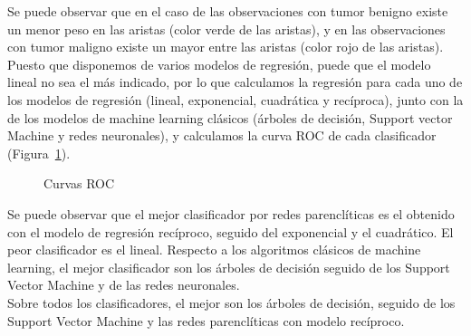 Se puede observar que en el caso de las observaciones con tumor benigno existe un menor peso en las aristas (color verde de las aristas), y en las observaciones con tumor maligno existe un mayor entre las aristas (color rojo de las aristas).\\

Puesto que disponemos de varios modelos de regresión, puede que el modelo lineal no sea el más indicado, por lo que calculamos la regresión para cada uno de los modelos de regresión (lineal, exponencial, cuadrática y recíproca), junto con la de los modelos de machine learning clásicos (árboles de decisión, Support vector Machine y redes neuronales), y calculamos la curva ROC de cada clasificador (Figura~\ref{fig:roc_cancer}).\\

\begin{figure}[tbph!]
	
		\begin{center}
		\end{center}
	\caption{Curvas ROC}
	\label{fig:roc_cancer}
\end{figure}

Se puede observar que el mejor clasificador por redes parenclíticas es el obtenido con el modelo de regresión recíproco, seguido del exponencial y el cuadrático. El peor clasificador es el lineal. Respecto a los algoritmos clásicos de machine learning, el mejor clasificador son los árboles de decisión seguido de los Support Vector Machine y de las redes neuronales.\\

Sobre todos los clasificadores, el mejor son los árboles de decisión, seguido de los Support Vector Machine y las redes parenclíticas con modelo recíproco.\\
 
